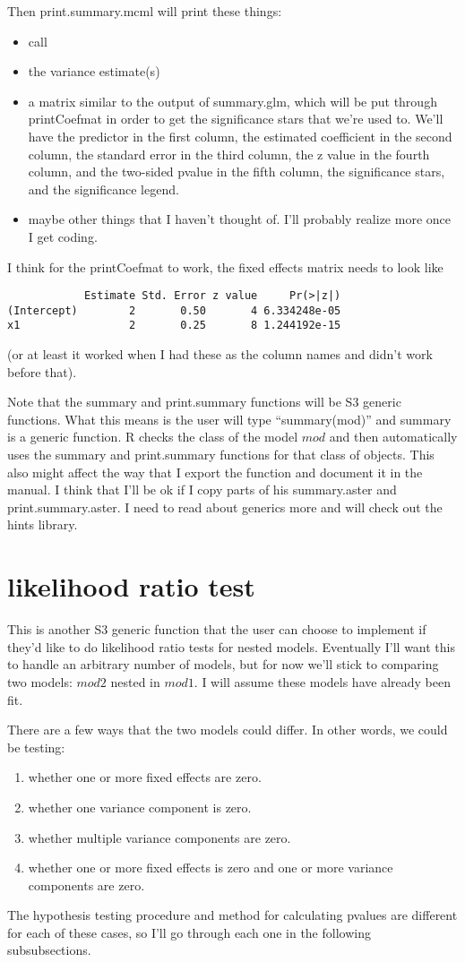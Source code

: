 \documentclass{article}
\begin{document}
Then print.summary.mcml will print these things:
\begin{itemize}
\item call
\item the variance estimate(s)
\item a matrix similar to the output of summary.glm, which will be put through printCoefmat in order to get the significance stars that we're used to. We'll have the predictor in the first column, the estimated coefficient in the second column, the standard error in the third column, the z value in the fourth column, and the two-sided pvalue  in the fifth column, the significance stars, and the significance legend.
\item maybe other things that I haven't thought of. I'll probably realize more once I get coding.
\end{itemize}

I think for the printCoefmat to work, the fixed effects matrix needs to look like
\begin{verbatim}
            Estimate Std. Error z value     Pr(>|z|)
(Intercept)        2       0.50       4 6.334248e-05
x1                 2       0.25       8 1.244192e-15
\end{verbatim}
(or at least it worked when I had these as the column names and didn't work before that).

Note that the summary and print.summary functions will be S3 generic functions.  What this means is the user will type ``summary(mod)'' and summary is a generic function. R checks the class of the model $mod$ and then automatically uses the summary and print.summary functions for that class of objects. This also might affect the way that I export the function and document it in the manual.  I think that I'll be ok if I copy parts of his summary.aster and print.summary.aster. I need to read about generics more and will check out the hints library.

\section{likelihood ratio test}
This is another S3 generic function that the user can choose to implement if they'd  like  to do likelihood ratio tests for nested models. Eventually I'll want this to handle an arbitrary number of models, but for now we'll stick to comparing two models: $mod2$ nested in $mod1$.  I will assume these models have already been fit. 


 There are a few ways that the two models could differ. In other words, we could be testing:
 \begin{enumerate}
 \item whether one or more fixed effects are zero.
 \item whether one variance component is zero.
 \item whether multiple variance components are zero.
 \item whether one or more fixed effects is zero and one or more variance components are zero. 
\end{enumerate}
The hypothesis testing procedure and method for calculating pvalues are different for each of these cases, so I'll go through each one in the following subsubsections.
\end{document}
